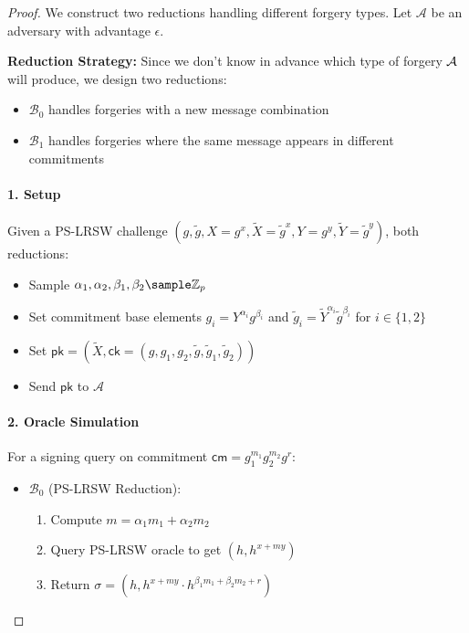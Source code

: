 \begin{proof}\label{eufcma-proof}
We construct two reductions handling different forgery types. Let $\mathcal{A}$ be an adversary with advantage $\epsilon$.

\textbf{Reduction Strategy: } Since we don't know in advance which type of forgery $\mathcal{A}$ will produce, we design two reductions:
\begin{itemize}
    \item $\mathcal{B}_0$ handles forgeries with a new message combination
    \item $\mathcal{B}_1$ handles forgeries where the same message appears in different commitments
\end{itemize}

\paragraph{1. Setup}
Given a PS-LRSW challenge $(g, \tilde{g}, X=g^x, \tilde{X}=\tilde{g}^x, Y=g^y, \tilde{Y}=\tilde{g}^y)$, both reductions:
\begin{itemize}
    \item Sample $\alpha_1, \alpha_2, \beta_1, \beta_2 \sample \Z_p$ 
    \item Set commitment base elements $g_i = Y^{\alpha_i}g^{\beta_i}$ and $\tilde{g}_i = \tilde{Y}^{\alpha_i}\tilde{g}^{\beta_i}$ for $i \in \{1,2\}$
    \item Set $\mathsf{pk} = (\tilde{X}, \mathsf{ck} = (g, g_1, g_2, \tilde{g}, \tilde{g}_1, \tilde{g}_2))$
    \item Send $\mathsf{pk}$ to $\mathcal{A}$
\end{itemize}

\paragraph{2. Oracle Simulation}
For a signing query on commitment $\mathsf{cm} = g_1^{m_1}g_2^{m_2}g^r$:
\begin{itemize}
    \item $\mathcal{B}_0$ (PS-LRSW Reduction):
    \begin{enumerate}
        \item Compute $m = \alpha_1m_1 + \alpha_2m_2$ 
        \item Query PS-LRSW oracle to get $(h, h^{x+my})$
        \item Return $\sigma = (h, h^{x+my} \cdot h^{\beta_1m_1 + \beta_2m_2 + r})$
    \end{enumerate}
    

\end{itemize}
\end{proof}
